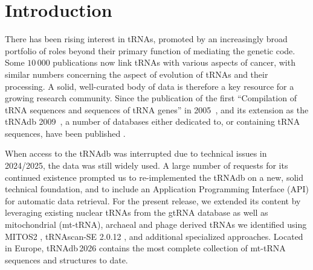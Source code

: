 \documentclass[unnumsec,webpdf,contemporary,large]{oup-authoring-template}
\begin{document}
%
%

\maketitle

\section{Introduction}

There has been rising interest in tRNAs, promoted by an increasingly broad
portfolio of roles beyond their primary function of mediating the genetic
code. Some $10\,000$ publications now link tRNAs with various aspects of
cancer, with similar numbers concerning the aspect of evolution of tRNAs
and their processing.  A solid, well-curated body of data is therefore a
key resource for a growing research community.  Since the publication of
the first ``Compilation of tRNA sequences and sequences of tRNA genes'' in
2005~\cite{sprinzl:2005}, and its extension as the tRNAdb
2009~\cite{juehling:2009}, a number of databases either dedicated to, or
containing tRNA sequences, have been published \cite{gtrnadb, trnadb-ce,
  modomics}.

When access to the tRNAdb was interrupted due to technical issues in
2024/2025, the data was still widely used. A large number of requests for
its continued existence prompted us to re-implemented the tRNAdb on a new,
solid technical foundation, and to include an Application Programming
Interface (API) for automatic data retrieval. For the present release, we
extended its content by leveraging existing nuclear tRNAs from the gtRNA
database as well as mitochondrial {(mt-tRNA)}, archaeal and phage derived tRNAs we
identified using MITOS2 \cite{mitos2}, tRNAscan-SE 2.0.12 \cite{tRNAscan},
and additional specialized approaches. {Located in Europe, tRNAdb\,2026
 contains the most complete collection of mt-tRNA sequences and structures to date.}
\end{document}
